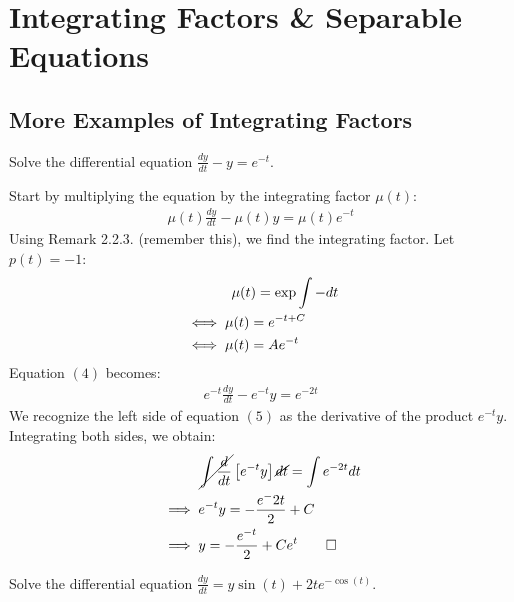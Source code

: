 \section{Integrating Factors \& Separable Equations}

\subsection{More Examples of Integrating Factors}

\begin{example}
    Solve the differential equation $\frac{dy}{dt} - y = e^{-t}$.
\end{example}
\begin{solution}
    Start by multiplying the equation by the integrating factor $\mu(t)$:
    \begin{align}
        \mu(t)\frac{dy}{dt} - \mu(t)y = \mu(t)e^{-t}
    \end{align}
    Using Remark 2.2.3. (remember this), we find the integrating factor. Let $p(t) = -1$: 
    \begin{align*}
        &\hspace{1.2cm} \mu(t) = \exp \int -dt \\
        &\iff \mu(t) = e^{-t + C} \\
        &\iff \mu(t) = Ae^{-t} 
     \end{align*}
    Equation $(4)$ becomes:
    \begin{align}
        e^{-t}\frac{dy}{dt} - e^{-t}y = e^{-2t}
    \end{align}
    We recognize the left side of equation $(5)$ as the derivative of the product $e^{-t}y$. Integrating both sides, we obtain:
    \begin{align*}
        &\hspace{1cm}\cancel{\int \frac{d}{dt}}\left[e^{-t}y\right]\cancel{dt} = \int e^{-2t}dt \\
        &\implies e^{-t}y = -\frac{e^-2t}{2} + C \\
        &\implies y = -\frac{e^{-t}}{2} + Ce^t \qedhere
    \end{align*}
\end{solution}
\begin{example}
    Solve the differential equation $\frac{dy}{dt} = y\sin(t) + 2te^{-\cos(t)}$.
\end{example}

